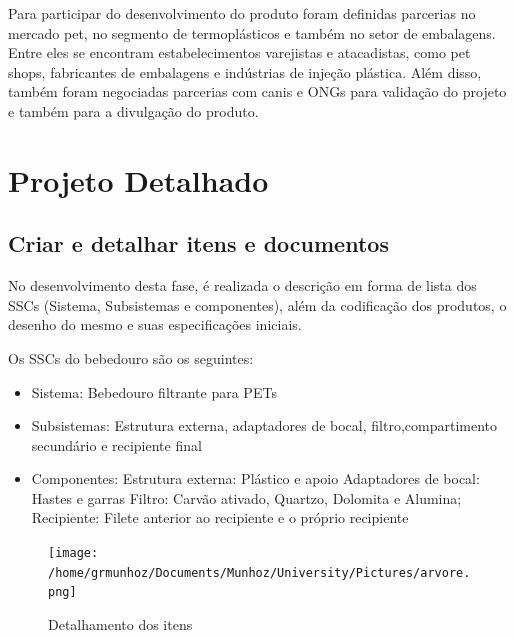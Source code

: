 \documentclass[
	12pt,				%
	openright,			%
	oneside,			%
	a4paper,			%
	english,			%
	french,				%
	spanish,			%
	brazil				%
	]{abntex2}
\begin{document}
Para participar do desenvolvimento do produto foram definidas parcerias no mercado pet, no segmento de termoplásticos e também no setor de embalagens. Entre eles se encontram estabelecimentos varejistas e atacadistas, como pet shops, fabricantes de embalagens e indústrias de injeção plástica. Além disso, também foram negociadas parcerias com canis e ONGs para validação do projeto e também para a divulgação do produto.


\newpage
\chapter{Projeto Detalhado}

\section{Criar e detalhar itens e documentos}

No desenvolvimento desta fase, é realizada o descrição em forma de lista dos SSCs (Sistema, Subsistemas e componentes), além da codificação dos produtos, o desenho do mesmo e suas especificações iniciais.

Os SSCs do bebedouro são os seguintes:

\begin{itemize}
\item Sistema: Bebedouro filtrante para PETs
\item Subsistemas: Estrutura externa, adaptadores de bocal, filtro,compartimento secundário e recipiente final
\item Componentes: 
\subitem Estrutura externa: Plástico e apoio
\subitem Adaptadores de bocal: Hastes e garras
\subitem Filtro: Carvão ativado,  Quartzo, Dolomita e Alumina;
\subitem Recipiente: Filete anterior ao recipiente e o próprio recipiente
\end{itemize}

\begin{figure}[H]
\begin{center}
\caption{Detalhamento dos itens}
\texttt{[image: /home/grmunhoz/Documents/Munhoz/University/Pictures/arvore.png]} 
\label{figetapas}
\end{center}
\end{figure}
\end{document}
